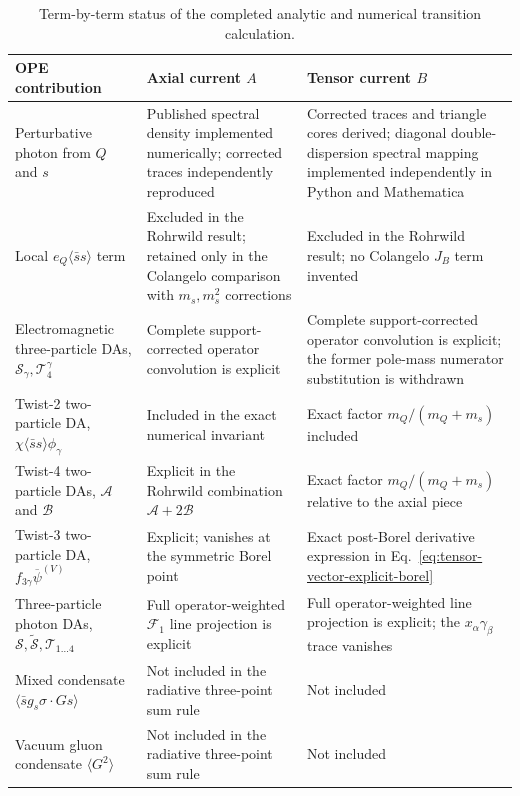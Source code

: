 \documentclass[11pt]{article}
\begin{document}
\begin{table}[H]
  \centering
  \small
  \begin{tabular}{p{}p{}p{}}
    \toprule
    OPE contribution & Axial current $A$ & Tensor current $B$\\
    \midrule
    Perturbative photon from $Q$ and $s$
      & Published spectral density implemented numerically; corrected traces
        independently reproduced
      & Corrected traces and triangle cores derived; diagonal
        double-dispersion spectral mapping implemented independently in
        Python and Mathematica\\
    Local $e_Q\langle\bar ss\rangle$ term
      & Excluded in the Rohrwild result; retained only in the Colangelo
        comparison with $m_s,m_s^2$ corrections
      & Excluded in the Rohrwild result; no Colangelo $J_B$ term invented\\
    Electromagnetic three-particle DAs,
      $\mathcal S_\gamma,\mathcal T_4^\gamma$
      & Complete support-corrected operator convolution is explicit
      & Complete support-corrected operator convolution is explicit; the
        former pole-mass numerator substitution is withdrawn\\
    Twist-2 two-particle DA,
      $\chi\langle\bar ss\rangle\phi_\gamma$
      & Included in the exact numerical invariant
      & Exact factor $m_Q/(m_Q+m_s)$ included\\
    Twist-4 two-particle DAs,
      $\mathcal A$ and $\mathcal B$
      & Explicit in the Rohrwild combination $\mathcal A+2\mathcal B$
      & Exact factor $m_Q/(m_Q+m_s)$ relative to the axial piece\\
    Twist-3 two-particle DA,
      $f_{3\gamma}\overline\psi^{(V)}$
      & Explicit; vanishes at the symmetric Borel point
      & Exact post-Borel derivative expression in
        Eq.~\eqref{eq:tensor-vector-explicit-borel}\\
    Three-particle photon DAs,
      $\mathcal S,\widetilde{\mathcal S},\mathcal T_{1\ldots4}$
      & Full operator-weighted $\mathcal F_1$ line projection is explicit
      & Full operator-weighted line projection is explicit; the
        $x_\alpha\gamma_\beta$ trace vanishes\\
    Mixed condensate
      $\langle\bar s g_s\sigma\cdot Gs\rangle$
      & Not included in the radiative three-point sum rule
      & Not included\\
    Vacuum gluon condensate $\langle G^2\rangle$
      & Not included in the radiative three-point sum rule
      & Not included\\
    \bottomrule
  \end{tabular}
  \caption{Term-by-term status of the completed analytic and numerical
  transition calculation.}
  \label{tab:ope-status}
\end{table}
\end{document}
